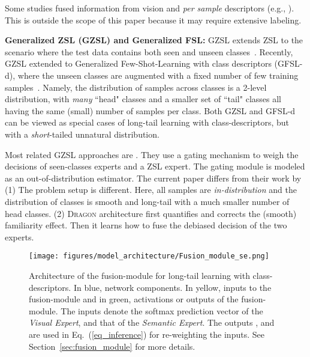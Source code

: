 \documentclass[10pt,twocolumn,letterpaper]{article}
\newcommand{\secref}[1]{Section~\ref{#1}}
\renewcommand{\eqref}[1]{Eq.~(\ref{#1})}
\newcommand{\DRAGON}{\textsc{Dragon}}
\begin{document}
Some studies fused information from vision and \textit{per sample} descriptors (e.g., \cite{Zhang2016LearningDR}). This is outside the scope of this paper because it may require extensive labeling. 

\textbf{Generalized ZSL (GZSL) and Generalized FSL:}  GZSL extends ZSL to the scenario where the test data contains both seen and unseen classes~\cite{chao,xianCVPR,socher2013zero}. Recently, GZSL extended to Generalized Few-Shot-Learning with class descriptors (GFSL-d), where the unseen classes are augmented with a fixed number of few training samples~\cite{Schnfeld2019GeneralizedZL,REVISE}.
Namely, the distribution of samples across classes is a 2-level distribution, with \textit{many} ``head" classes and a smaller set of ``tail" classes all having the same (small) number of samples per class. Both GZSL and GFSL-d can be viewed as special cases of long-tail learning with class-descriptors, but with a \textit{short}-tailed unnatural distribution. 

 
Most related GZSL approaches are \cite{Atzmon2018AdaptiveCS,socher2013zero,ZhangGZSL}.  They use a gating mechanism to weigh the decisions of seen-classes experts and a ZSL expert. The gating module is modeled as an out-of-distribution estimator. The current paper differs from their work by (1) The problem setup is different. Here, all samples are \textit{in-distribution} and the distribution of classes is smooth and long-tail with a much smaller number of head classes. 
(2) \DRAGON{} architecture first quantifies and corrects the (smooth) familiarity effect. Then it learns how to fuse the debiased decision of the two experts.


\begin{figure*}
    \begin{center}
    \texttt{[image: figures/model\_architecture/Fusion\_module\_se.png]}
    \end{center}
   \caption{Architecture of the fusion-module for long-tail learning with class-descriptors. In blue, network components. In yellow, inputs to the fusion-module and in green, activations or outputs of the fusion-module. The inputs  denote the softmax prediction vector of the \textit{Visual Expert}, and  that of the \textit{Semantic Expert}. The outputs ,  and  are used in \eqref{eq_inference} for re-weighting the inputs. See \secref{sec:fusion_module} for more details.}
    \label{fig:fusion_module}
\label{fig:short}
\end{figure*}
 
\end{document}
